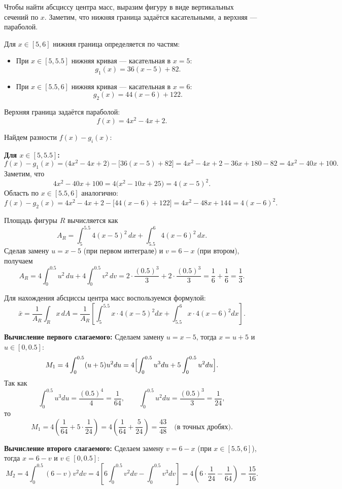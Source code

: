 \documentclass[12pt,a4paper]{article}
\begin{document}
Чтобы найти абсциссу центра масс, выразим фигуру в виде вертикальных сечений по \(x\). Заметим, что нижняя граница задаётся касательными, а верхняя --- параболой.

Для \(x\in[5,6]\) нижняя граница определяется по частям:
\begin{itemize}
  \item При \(x\in[5,5.5]\) нижняя кривая --- касательная в \(x=5\): 
    \[
    g_1(x)=36(x-5)+82.
    \]
  \item При \(x\in[5.5,6]\) нижняя кривая --- касательная в \(x=6\):
    \[
    g_2(x)=44(x-6)+122.
    \]
\end{itemize}
Верхняя граница задаётся параболой:
\[
f(x)=4x^2-4x+2.
\]

Найдем разности \(f(x)-g_i(x)\):

\textbf{Для \(x\in[5,5.5]\):}
\[
f(x)-g_1(x)=\bigl(4x^2-4x+2\bigr)-\bigl[36(x-5)+82\bigr]
=4x^2-4x+2-36x+180-82=4x^2-40x+100.
\]
Заметим, что
\[
4x^2-40x+100=4\bigl(x^2-10x+25\bigr)=4(x-5)^2.
\]
Область по \(x\in[5.5,6]\) аналогично:
\[
f(x)-g_2(x)=4x^2-4x+2-\bigl[44(x-6)+122\bigr]
=4x^2-48x+144=4(x-6)^2.
\]

Площадь фигуры \(R\) вычисляется как
\[
A_R=\int_{5}^{5.5}4(x-5)^2\,dx+\int_{5.5}^{6}4(x-6)^2\,dx.
\]
Сделав замену \(u=x-5\) (при первом интеграле) и \(v=6-x\) (при втором), получаем
\[
A_R=4\int_{0}^{0.5}u^2\,du+4\int_{0}^{0.5}v^2\,dv
=2\cdot \frac{(0.5)^3}{3}+2\cdot \frac{(0.5)^3}{3}
=\frac{1}{6}+\frac{1}{6}=\frac{1}{3}.
\]

Для нахождения абсциссы центра масс воспользуемся формулой:
\[
\bar{x}=\frac{1}{A_R}\int_{R} x\,dA=\frac{1}{A_R}\left[\int_{5}^{5.5}x\cdot 4(x-5)^2dx+\int_{5.5}^{6}x\cdot 4(x-6)^2dx\right].
\]

\textbf{Вычисление первого слагаемого:} Сделаем замену \(u=x-5\), тогда \(x=u+5\) и \(u\in[0,0.5]\):
\[
M_1=4\int_{0}^{0.5}(u+5)u^2du
=4\Bigl[\int_{0}^{0.5}u^3du+5\int_{0}^{0.5}u^2du\Bigr].
\]
Так как
\[
\int_{0}^{0.5}u^3du=\frac{(0.5)^4}{4}=\frac{1}{64},\qquad \int_{0}^{0.5}u^2du=\frac{(0.5)^3}{3}=\frac{1}{24},
\]
то
\[
M_1=4\left(\frac{1}{64}+5\cdot\frac{1}{24}\right)
=4\left(\frac{1}{64}+\frac{5}{24}\right)
=\frac{43}{48}\quad \text{(в точных дробях)}.
\]

\textbf{Вычисление второго слагаемого:} Сделаем замену \(v=6-x\) (при \(x\in[5.5,6]\)), тогда \(x=6-v\) и \(v\in[0,0.5]\):
\[
M_2=4\int_{0}^{0.5}(6-v)v^2dv
=4\left[6\int_{0}^{0.5}v^2dv-\int_{0}^{0.5}v^3dv\right]
=4\left(6\cdot\frac{1}{24}-\frac{1}{64}\right)
=\frac{15}{16}.
\]
\end{document}
